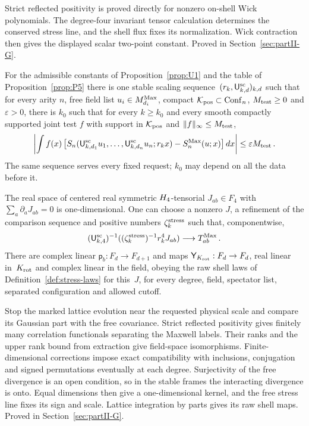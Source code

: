 Strict reflected positivity is proved directly for nonzero on-shell Wick
polynomials. The degree-four invariant tensor calculation determines the
conserved stress line, and the shell flux fixes its normalization. Wick
contraction then gives the displayed scalar two-point constant.
Proved in Section~\ref{sec:partII-G}.

\begin{proposition}\label{prop:P6}
For the admissible constants of Proposition~\ref{prop:U1} and the table of Proposition~\ref{prop:P5} there is one stable scaling sequence~$(r_k,\mathsf{U}_{k,d}^{\mathrm{sc}})_{k,d}$ such that for every arity $n$, free field list $u_i\in M_{d_i}^{\mathrm{Max}}$, compact $\mathcal K_{\rm pos}\subset\mathrm{Conf}_{n}$, $M_{\rm test}\ge0$ and $\varepsilon>0$, there is $k_0$ such that for every $k\ge k_0$ and every smooth compactly supported joint test $f$ with support in $\mathcal K_{\rm pos}$ and $\|f\|_\infty\le M_{\rm test}$,
\begin{equation}\label{eq:P6-1}
\left|\int f(x)\left[S_n(\mathsf{U}_{k,d_1}^{\mathrm{sc}}u_1,\ldots,\mathsf{U}_{k,d_n}^{\mathrm{sc}}u_n;r_kx)-S^{\mathrm{Max}}_n(u;x)\right]dx\right|\le\varepsilon M_{\rm test}\,.
\end{equation}
The same sequence serves every fixed request; $k_0$ may depend on all the data before it.

The real space of centered real symmetric $H_4$-tensorial $J_{ab}\in F_4$ with $\sum_a\partial_aJ_{ab}=0$ is one-dimensional. One can choose a nonzero $J$, a refinement of the comparison sequence and positive numbers $\zeta_k^{\rm stress}$ such that, componentwise,
\begin{equation}\label{eq:P6-2}
(\mathsf{U}_{k,4}^{\mathrm{sc}})^{-1}((\zeta_k^{\rm stress})^{-1}r_k^4J_{ab})\longrightarrow T^{\mathrm{Max}}_{ab}\,.
\end{equation}
There are complex linear $\mathsf p_b:F_d\to F_{d+1}$ and maps $\mathsf Y_{K_{\rm rot}}:F_d\to F_d$, real linear in~$K_{\rm rot}$ and complex linear in the field, obeying the raw shell laws of Definition~\ref{def:stress-laws} for this~$J$, for every degree, field, spectator list, separated configuration and allowed cutoff.
\end{proposition}

Stop the marked lattice evolution near the requested physical scale and
compare its Gaussian part with the free covariance. Strict reflected positivity
gives finitely many correlation functionals separating the Maxwell labels.
Their ranks and the upper rank bound from extraction give field-space
isomorphisms. Finite-dimensional corrections impose exact compatibility with
inclusions, conjugation and signed permutations eventually at each degree.
Surjectivity of the free divergence is an open condition, so in the stable frames
the interacting divergence is onto. Equal dimensions then give a one-dimensional
kernel, and the free stress line fixes its sign and scale. Lattice integration by
parts gives its raw shell maps. Proved in Section~\ref{sec:partII-G}.

